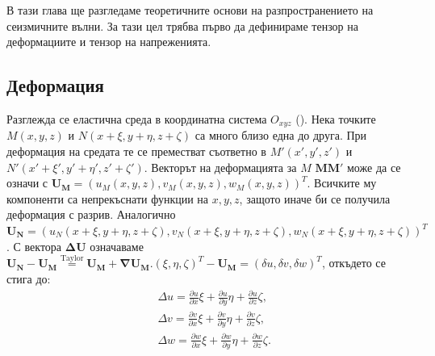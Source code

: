 \documentclass{report}
\begin{document}
	В тази глава ще разгледаме теоретичните основи на разпространението на сеизмичните вълни. За тази цел трябва първо да дефинираме тензор на деформациите и тензор на напреженията.
	
	\subsection{Деформация}
	Разглежда се еластична среда в координатна система $O_{xyz}$ (\cite{geofizika_chast1}\cite{slawinski2015wavesrays}\cite{lay1995modern}\cite{aki_richards2002_quantitative}). Нека точките $M(x,y,z)$ и $N(x+\xi, y+\eta,z+\zeta)$ са много близо една до друга. При деформация на средата те се преместват съответно в $M'(x',y',z')$ и $N'(x'+\xi', y'+\eta',z'+\zeta')$. Векторът на деформацията за $M$ $\boldsymbol{MM'}$ може да се означи с $\boldsymbol{U_M}=(u_M(x,y,z),v_M(x,y,z),w_M(x,y,z))^T$. Всичките му компоненти са непрекъснати функции на $x, y, z$, защото иначе би се получила деформация с разрив. Аналогично $\boldsymbol{U_N}=(u_N(x+\xi,y+\eta,z+\zeta),v_N(x+\xi,y+\eta,z+\zeta),w_N(x+\xi,y+\eta,z+\zeta))^T$. С вектора $\boldsymbol{\Delta U}$ означаваме $\boldsymbol{U_N}-\boldsymbol{U_M}\overset{\text{Taylor}}{=}\boldsymbol{U_M}+\boldsymbol{\nabla U_M}.(\xi,\eta,\zeta)^T-\boldsymbol{U_M}=(\delta u, \delta v, \delta w)^T$, откъдето се стига до:
	\begin{align*}
		&\Delta u = \frac{\partial u}{\partial x} \xi + \frac{\partial u}{\partial y} \eta + \frac{\partial u}{\partial z} \zeta,\\
		&\Delta v = \frac{\partial v}{\partial x} \xi + \frac{\partial v}{\partial y} \eta + \frac{\partial v}{\partial z} \zeta,\\
		&\Delta w = \frac{\partial w}{\partial x} \xi + \frac{\partial w}{\partial y} \eta + \frac{\partial w}{\partial z} \zeta.\\
	\end{align*}
	
\end{document}
